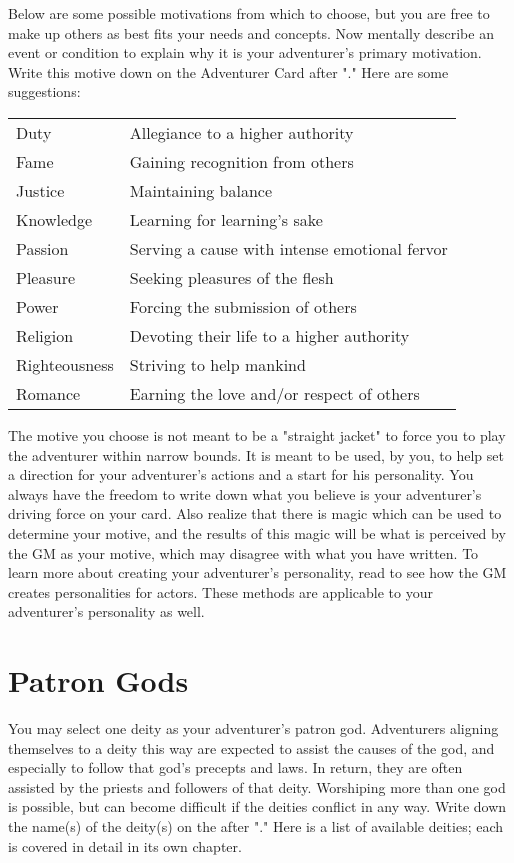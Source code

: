 \begin{multicols*}{2}
Below are some possible motivations from which to choose, but you are free to make up others as best fits your needs and concepts. Now mentally describe an event or condition to explain why it is your adventurer's primary motivation. Write this motive down on the Adventurer Card after "." Here are some suggestions:
\begin{normboxc}[Motivation]
\small
\begin{tabularx}{\linewidth}{@{} l L}
Duty & Allegiance to a higher authority\\
Fame & Gaining recognition from others\\
Justice & Maintaining balance\\
Knowledge & Learning for learning's sake\\
Passion & Serving a cause with intense emotional fervor\\
Pleasure & Seeking pleasures of the flesh\\
Power & Forcing the submission of others\\
Religion & Devoting their life to a higher authority\\
Righteousness & Striving to help mankind\\
Romance & Earning the love and/or respect of others
\end{tabularx}
\end{normboxc}

The motive you choose is not meant to be a "straight jacket" to force you to play the adventurer within narrow bounds. It is meant to be used, by you, to help set a direction for your adventurer's actions and a start for his personality. You always have the freedom to write down what you believe is your adventurer's driving force on your card. Also realize that there is magic which can be used to determine your motive, and the results of this magic will be what is perceived by the GM as your motive, which may disagree with what you have written.
To learn more about creating your adventurer's personality, read  to see how the GM creates personalities for actors. These methods are applicable to your adventurer's personality as well.
\section{Patron Gods}
You may select one deity as your adventurer's patron god. Adventurers aligning themselves to a deity this way are expected to assist the causes of the god, and especially to follow that god's precepts and laws. In return, they are often assisted by the priests and followers of that deity. Worshiping more than one god is possible, but can become difficult if the deities conflict in any way. Write down the name(s) of the deity(s) on the  after "." Here is a list of available deities; each is covered in detail in its own chapter.


\end{multicols*}

